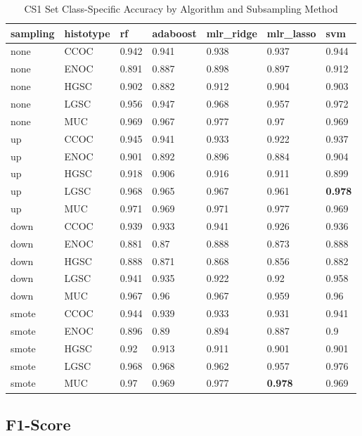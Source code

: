 \documentclass[
]{report}
\begin{document}
\begin{table}

\caption{\label{tab:cs1-accuracy-class-table}CS1 Set Class-Specific Accuracy by Algorithm and Subsampling Method}
\centering
\begin{tabular}[t]{l|l|l|l|l|l|l}
\hline
sampling & histotype & rf & adaboost & mlr\_ridge & mlr\_lasso & svm\\
\hline
none & CCOC & 0.942 & 0.941 & 0.938 & 0.937 & 0.944\\
\hline
none & ENOC & 0.891 & 0.887 & 0.898 & 0.897 & 0.912\\
\hline
none & HGSC & 0.902 & 0.882 & 0.912 & 0.904 & 0.903\\
\hline
none & LGSC & 0.956 & 0.947 & 0.968 & 0.957 & 0.972\\
\hline
none & MUC & 0.969 & 0.967 & 0.977 & 0.97 & 0.969\\
\hline
up & CCOC & 0.945 & 0.941 & 0.933 & 0.922 & 0.937\\
\hline
up & ENOC & 0.901 & 0.892 & 0.896 & 0.884 & 0.904\\
\hline
up & HGSC & 0.918 & 0.906 & 0.916 & 0.911 & 0.899\\
\hline
up & LGSC & 0.968 & 0.965 & 0.967 & 0.961 & \textbf{0.978}\\
\hline
up & MUC & 0.971 & 0.969 & 0.971 & 0.977 & 0.969\\
\hline
down & CCOC & 0.939 & 0.933 & 0.941 & 0.926 & 0.936\\
\hline
down & ENOC & 0.881 & 0.87 & 0.888 & 0.873 & 0.888\\
\hline
down & HGSC & 0.888 & 0.871 & 0.868 & 0.856 & 0.882\\
\hline
down & LGSC & 0.941 & 0.935 & 0.922 & 0.92 & 0.958\\
\hline
down & MUC & 0.967 & 0.96 & 0.967 & 0.959 & 0.96\\
\hline
smote & CCOC & 0.944 & 0.939 & 0.933 & 0.931 & 0.941\\
\hline
smote & ENOC & 0.896 & 0.89 & 0.894 & 0.887 & 0.9\\
\hline
smote & HGSC & 0.92 & 0.913 & 0.911 & 0.901 & 0.901\\
\hline
smote & LGSC & 0.968 & 0.968 & 0.962 & 0.957 & 0.976\\
\hline
smote & MUC & 0.97 & 0.969 & 0.977 & \textbf{0.978} & 0.969\\
\hline
\end{tabular}
\end{table}

\hypertarget{f1-score-1}{%
\subsection{F1-Score}\label{f1-score-1}}
\end{document}
